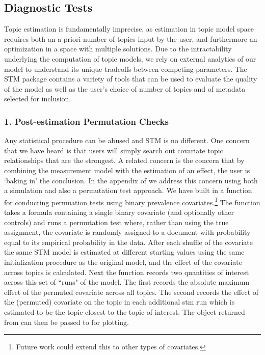 \documentclass[nojss]{jss}
\begin{document}
\subsection{Diagnostic Tests}
Topic estimation is fundamentally imprecise, as estimation in topic model space requires both an a priori number of topics input by the user, and furthermore an optimization in a space with multiple solutions. Due to the intractability underlying the computation of topic models, we rely on external analytics of our model to understand its unique tradeoffs between competing parameters.  The STM package contains a variety of tools that can be used to evaluate the quality of the model as well as the user's choice of number of topics and of metadata selected for inclusion.
 

\subsubsection{1. Post-estimation Permutation Checks}
Any statistical procedure can be abused and STM is no different. One concern that we have heard is that users will simply search out covariate topic relationships that are the strongest. A related concern is the concern that by combining the measurement model with the estimation of an effect, the user is `baking in' the conclusion. In the appendix of \cite{ajps} we address this concern using both a simulation and also  a permutation test approach.  We have built in a function for conducting permuation tests using binary prevalence covariates.\footnote{Future work could extend this to other types of covariates.} The  function takes a formula containing a single binary covariate (and optionally other controls) and runs a permutation test where, rather than using the true assignment, the covariate is randomly assigned to a document with probability equal to its empirical probability in the data.
After each shuffle of the covariate the same STM model is estimated at different starting values using the same initialization procedure as the original model, and the effect of the covariate across topics is calculated.
Next the function records two quantities of interest across this set of ``runs" of the model. The first records the absolute maximum effect of the permuted covariate across all topics.
The second records the effect of the (permuted) covariate on the topic in each additional stm run which is estimated to be the topic closest to the topic of interest. The object returned from  can then be passed to  for plotting.
\end{document}
